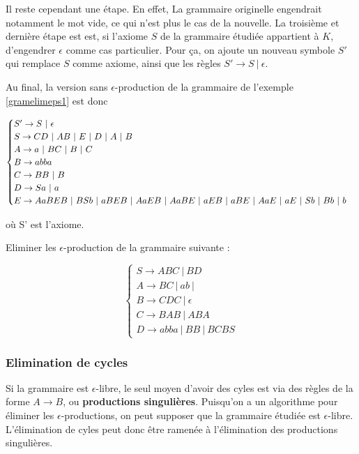 Il reste cependant une étape. En effet, La grammaire originelle engendrait notamment le mot vide, ce qui n'est plus le cas de la nouvelle. La troisième et dernière étape est est, si l'axiome $S$ de la grammaire étudiée appartient à $K$, d'engendrer $\epsilon$ comme cas particulier. Pour ça, on ajoute un nouveau symbole $S'$ qui remplace $S$ comme axiome, ainsi que les règles $S' \rightarrow S~|~\epsilon$.

\begin{example}

Au final, la version sans $\epsilon$-production de la grammaire de l'exemple \ref{gramelimeps1} est donc 

\[
\begin{cases}
S' \rightarrow S~|~\epsilon \\
S \rightarrow CD~|~AB~|~E\textcolor{black}{~|~D~|~A~|~B} \\
A \rightarrow a~|~BC\textcolor{black}{~|~B~|~C} \\
B \rightarrow abba \\
C \rightarrow BB\textcolor{black}{~|~B} \\
D \rightarrow Sa\textcolor{black}{~|~ a} \\
E \rightarrow AaBEB~|~BSb~|~\textcolor{black}{aBEB~|~AaEB~|~AaBE~|~aEB~|~aBE~|~AaE~|~aE~|~Sb~|~Bb~|~b}
\end{cases}
\]

où S' est l'axiome.

\end{example}

\begin{exercice}
Eliminer les $\epsilon$-production de la grammaire suivante :

\[
\begin{cases}
S \rightarrow ABC~|~BD \\
A \rightarrow BC~|~ab~|~ \\
B \rightarrow CDC~|~\epsilon \\
C \rightarrow BAB~|~ABA \\
D \rightarrow abba~|~BB~|~BCBS
\end{cases}
\]
\end{exercice}


\subsubsection{Elimination de cycles}

Si la grammaire est $\epsilon$-libre, le seul moyen d'avoir des cyles est via des règles de la forme $A \rightarrow B$, ou \textbf{productions singulières}. Puisqu'on a un algorithme pour éliminer les $\epsilon$-productions, on peut supposer que la grammaire étudiée est $\epsilon$-libre. L'élimination de cyles peut donc être ramenée à l'élimination des productions singulières.

